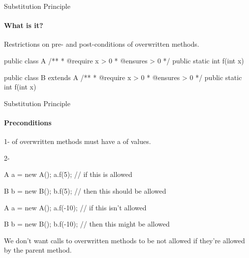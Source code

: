 \documentclass[week11]{csse2002}
\begin{document}
\begin{topic}{Substitution Principle}
\framesubtitle{What is it?}

\begin{subtopic}{1}
Restrictions on pre- and post-conditions of overwritten methods.
\end{subtopic}

\begin{subtopic}{2}
\begin{java}
public class A {
	/**
	 * @require x > 0
	 * @ensures \result > 0
	 */
	public static int f(int x) {}
}

public class B extends A {
	/**
	 * @require x > 0
	 * @ensures \result > 0
	 */
	public static int f(int x) {}
}
\end{java}
\end{subtopic}
\end{topic}

\begin{topic}{Substitution Principle}
\framesubtitle{Preconditions}

\begin{subtopic}{1-}
 of overwritten methods must have a  of values.
\end{subtopic}

\begin{subtopic}{2-}
\begin{java}
A a = new A();
a.f(5); // if this is allowed

B b = new B();
b.f(5); // then this should be allowed
\end{java}

\begin{java}
A a = new A();
a.f(-10); // if this isn't allowed

B b = new B();
b.f(-10); // then this might be allowed
\end{java}

We don't want calls to overwritten methods to be not allowed if they're allowed by the parent method.
\end{subtopic}
\end{topic}
\end{document}
